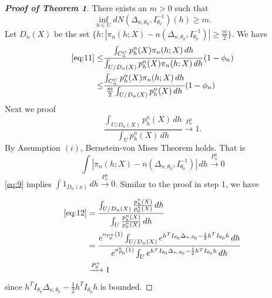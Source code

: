 \begin{proof}[\textbf{Proof of Theorem 1}]
    There exists an $m>0$ such that
\begin{equation}
    \inf_{h\in U} dN(\Delta_{n,\theta_0},I_{\theta_0}^{-1})(h)\geq m.
\end{equation}
Let $D_n(X)$ be the set $\{h: |\pi_{n}(h;X)-n(\Delta_{n,\theta_{0}},I_{\theta_{0}}^{-1})|\geq\frac{m}{2}\}$. We have
\begin{equation}\label{eq:13}
    \begin{aligned}
        \eqref{eq:11}\leq&\frac{\int_{C_n^C}p_h^n(X)\pi_n(h;X)\, dh}{\int_{U/D_n(X)} p_h^n(X)\pi_n(h;X)\, dh}(1-\phi_n)\\
        \leq&\frac{\int_{C_n^C}p_h^n(X)\pi_n(h;X)\, dh}{\frac{m}{2}\int_{U/D_n(X)} p_h^n(X)\, dh}(1-\phi_n)\\
    \end{aligned}
\end{equation}
Next we proof
\begin{equation}\label{eq:12}
    \frac{\int_{U/D_n(X)} p_h^n(X)\, dh}{\int_U p_h^n(X)\, dh}\xrightarrow{P_0^n}1.
\end{equation}
By Assumption $(i)$, Bernstein-von Mises Theorem holds. That is
\begin{equation}\label{eq:9}
 \int |\pi_{n}(h;X)-n(\Delta_{n,\theta_{0}},I_{\theta_{0}}^{-1})|\, dh\xrightarrow{P_0^n}0   
\end{equation}
\eqref{eq:9} implies $\int 1_{D_n(x)}\, dh\xrightarrow{P_0^n}0$. Similar to the proof in step 1, we have

\begin{equation}
\begin{aligned}
    \eqref{eq:12}&=\frac{\int_{U/D_n(X)} \frac{p_h^n(X)}{p_0^n(X)}\, dh}{\int_U \frac{p_h^n(X)}{p_0^n(X)}\, dh}\\
                 &=\frac{e^{o_{P^n_0}(1)}\int_{U/D_n(X)} e^{h^T I_{\theta_0}\Delta_{n,\theta_0}-\frac{1}{2}h^TI_{\theta_0}h} \, dh}{e^{o^n_{P_0}(1)}\int_U e^{h^T I_{\theta_0}\Delta_{n,\theta_0}-\frac{1}{2}h^TI_{\theta_0}h} \, dh}\\
                 &\xrightarrow{P_0^n} 1
\end{aligned}
\end{equation}
since $h^T I_{\theta_0}\Delta_{n,\theta_0}-\frac{1}{2}h^TI_{\theta_0}h$ is bounded.



\end{proof}
